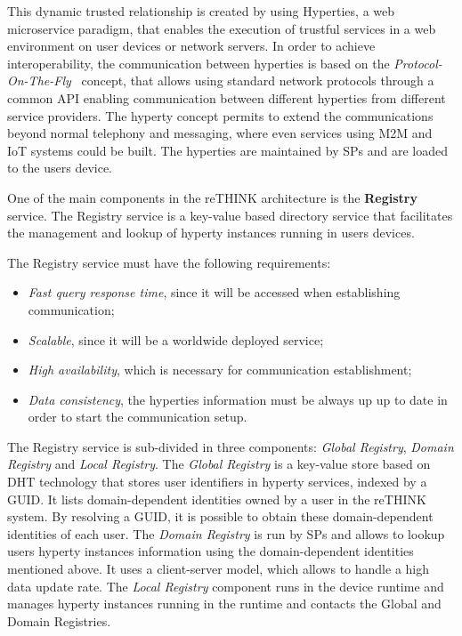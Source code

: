 This dynamic trusted relationship is created by using \ac{Hyperties}, a web microservice paradigm, that enables the execution of trustful services in a web environment on user devices or network servers.
In order to achieve interoperability, the communication between hyperties is based on the \textit{Protocol-On-The-Fly}~\cite{protofly} concept, that allows using standard network protocols through a common API enabling communication between different hyperties from different service providers.
The hyperty concept permits to extend the communications beyond normal telephony and messaging, where even services using \ac{M2M} and \ac{IoT} systems could be built.
The hyperties are maintained by \acp{SP} and are loaded to the users device.

One of the main components in the reTHINK architecture is the \textbf{Registry} service.
The Registry service is a key-value based directory service that facilitates the management and lookup of hyperty instances running in users devices.

The Registry service must have the following requirements:
\begin{itemize}
  \item \textit{Fast query response time}, since it will be accessed when establishing communication;
	\item \textit{Scalable}, since it will be a worldwide deployed service;
  \item \textit{High availability}, which is necessary for communication establishment;
  \item \textit{Data consistency}, the hyperties information must be always up up to date in order to start the communication setup.
\end{itemize}

The Registry service is sub-divided in three components: \textit{Global Registry}, \textit{Domain Registry} and \textit{Local Registry}.
The \textit{Global Registry} is a key-value store based on \ac{DHT} technology that stores user identifiers in hyperty services, indexed by a \ac{GUID}.
It lists domain-dependent identities owned by a user in the reTHINK system.
By resolving a \ac{GUID}, it is possible to obtain these domain-dependent identities of each user.
The \textit{Domain Registry} is run by \acp{SP} and allows to lookup users hyperty instances information using the domain-dependent identities mentioned above.
It uses a client-server model, which allows to handle a high data update rate.
The \textit{Local Registry} component runs in the device runtime and manages hyperty instances running in the runtime and contacts the Global and Domain Registries.

